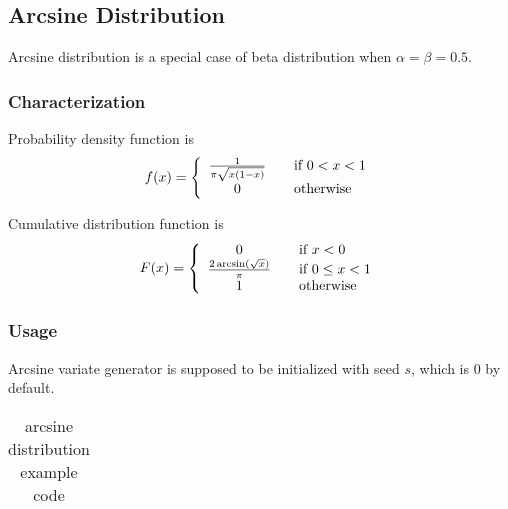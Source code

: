 \subsection{Arcsine Distribution} \label{arcsinedistribution}

Arcsine distribution is a special case of beta distribution when $\alpha = \beta = 0.5$.

\subsubsection{Characterization}

Probability density function is
\begin{equation}
 f(x) = \left\{
  \begin{array}{c l}
      \frac{1}{\pi \sqrt{x(1-x)}} & \quad \text{if $0 < x < 1$}\\
    0 & \quad \text{otherwise}
  \end{array} \right.
\end{equation}

Cumulative distribution function is
\begin{equation}
 F(x) = \left\{
  \begin{array}{c l}
      0                                    & \quad \text{if $x < 0$} \\
      \frac{2 \arcsin(\sqrt{x}) }{\pi}     & \quad \text{if $0 \leq x < 1$}\\
      1                                    & \quad \text{otherwise}
  \end{array} \right.
\end{equation}


\subsubsection{Usage}

Arcsine variate generator is supposed to be initialized with seed $s$, which is $0$ by default.

\begin{small}
\begin{ttfamily}
\begin{center}
\begin{longtable}{|l|}
\caption{arcsine distribution example code} \\
\hline 

\hline
\end{longtable}
\end{center}
\end{ttfamily}
\end{small}


